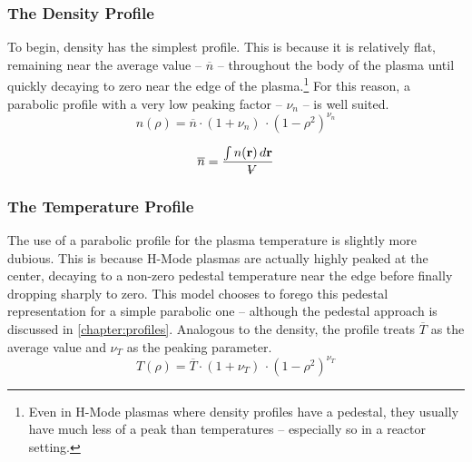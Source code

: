 \subsubsection{The Density Profile}

To begin, density has the simplest profile. This is because it is relatively flat, remaining near the average value -- $\overline n$ -- throughout the body of the plasma until quickly decaying to zero near the edge of the plasma.\footnote{Even in H-Mode plasmas where density profiles have a pedestal,\cite{density} they usually have much less of a peak than temperatures\cite{temperature} -- especially so in a reactor setting.\cite{pedestals}} For this reason, a parabolic profile with a very low peaking factor -- $\nu_n$ -- is well suited.
\begin{equation}
	n(\rho) = \overline n \cdot ( 1 + \nu_n ) \, \cdot ( 1 - \rho ^ 2 ) ^ {\nu_n}
\end{equation}

\begin{equation}
	\overline n = \frac{ \int n(\vec{\bold{r}}) \, d\vec{\bold{r}}  }{\volume}
\end{equation}


\subsubsection{The Temperature Profile}

The use of a parabolic profile for the plasma temperature is slightly more dubious. This is because H-Mode plasmas are actually highly peaked at the center, decaying to a non-zero pedestal temperature near the edge before finally dropping sharply to zero. This model chooses to forego this pedestal representation for a simple parabolic one -- although the pedestal approach is discussed in \cref{chapter:profiles}. Analogous to the density, the profile treats $\overline T$ as the average value and $\nu_T$ as the peaking parameter.
\begin{equation}
	T(\rho) = \overline T \cdot ( 1 + \nu_T ) \, \cdot ( 1 - \rho ^ 2 ) ^ {\nu_T}
\end{equation}

